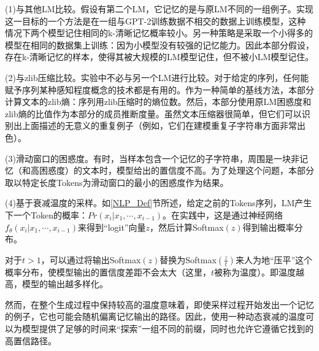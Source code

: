 (1)与其他LM比较。假设有第二个LM，它记忆的是与原LM不同的一组例子。实现这一目标的一个方法是在一组与GPT-2训练数据不相交的数据上训练模型，这种情况下两个模型记住相同的k-清晰记忆概率较小。另一种策略是采取一个小得多的模型在相同的数据集上训练：因为小模型没有较强的记忆能力。因此本部分假设，存在k-清晰记忆的样本，使得其被大规模的LM模型记住，但不被小LM模型记住。

(2)与zlib压缩比较。实验中不必与另一个LM进行比较。对于给定的序列，任何能赋予序列某种感知程度概念的技术都是有用的。作为一种简单的基线方法，本部分计算文本的zlib熵\cite{zlib}：序列用zlib压缩时的熵位数。然后，本部分使用原LM困惑度和zlib熵的比值作为本部分的成员推断度量。虽然文本压缩器很简单，但它们可以识别出上面描述的无意义的重复例子（例如，它们在建模重复子字符串方面非常出色）。

(3)滑动窗口的困惑度。有时，当样本包含一个记忆的子字符串，周围是一块非记忆（和高困惑度）的文本时，模型给出的置信度不高。为了处理这个问题，本部分取以特定长度Tokens为滑动窗口的最小的困惑度作为结果。

(4)基于衰减温度的采样。如\ref{NLP_Def}节所述，给定之前的Tokens序列，LM产生下一个Token的概率：$Pr(x_i |x_1,⋯,x_{i-1} )$。在实践中，这是通过神经网络$f_θ(x_i|x_1,⋯,x_{i-1})$来得到“logit”向量$z$，然后计算Softmax$(z)$得到输出概率分布。

对于$t>1$，可以通过将输出Softmax$(z)$替换为Softmax$(\frac{z}{t})$来人为地“压平”这个概率分布，使模型输出的置信度差距不会太大（这里，$t$被称为温度）。即温度越高，模型的输出越多样化。

然而，在整个生成过程中保持较高的温度意味着，即使采样过程开始发出一个记忆的例子，它也可能会随机偏离记忆输出的路径。因此，使用一种动态衰减的温度可以为模型提供了足够的时间来“探索”一组不同的前缀，同时也允许它遵循它找到的高置信路径。


